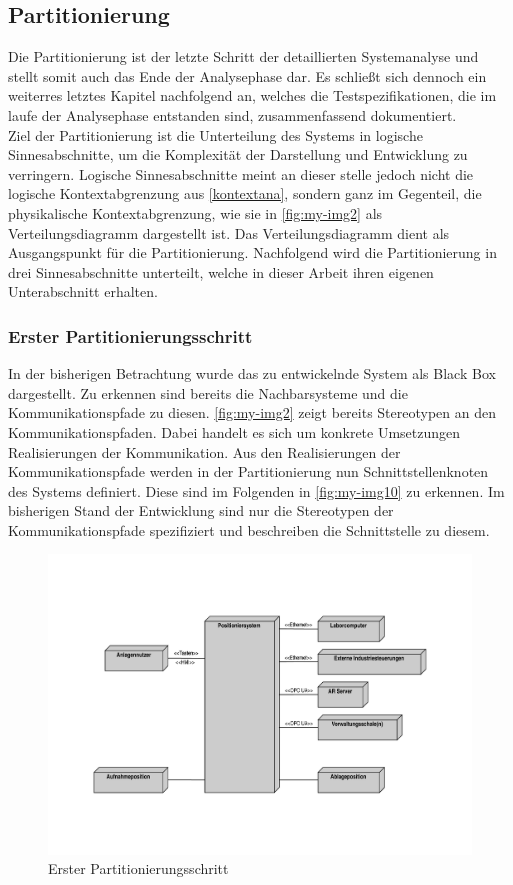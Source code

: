 \documentclass[../Bachelorarbeit.tex]{subfiles}
\begin{document}
\subsection{Partitionierung}
Die Partitionierung ist der letzte Schritt der detaillierten Systemanalyse und stellt somit auch das Ende der Analysephase dar. Es schließt sich dennoch ein weiterres letztes Kapitel nachfolgend an, welches die Testspezifikationen, die im laufe der Analysephase entstanden sind, zusammenfassend dokumentiert. \\
Ziel der Partitionierung ist die Unterteilung des Systems in logische Sinnesabschnitte, um die Komplexität der Darstellung und Entwicklung zu verringern. Logische Sinnesabschnitte meint an dieser stelle jedoch nicht die logische Kontextabgrenzung aus \autoref{kontextana}, sondern ganz im Gegenteil, die physikalische Kontextabgrenzung, wie sie in \autoref{fig:my-img2} als Verteilungsdiagramm dargestellt ist. Das Verteilungsdiagramm dient als Ausgangspunkt für die Partitionierung. Nachfolgend wird die Partitionierung in drei Sinnesabschnitte unterteilt, welche in dieser Arbeit ihren eigenen Unterabschnitt erhalten. \\ %

\subsubsection{Erster Partitionierungsschritt}
In der bisherigen Betrachtung wurde das zu entwickelnde System als Black Box dargestellt. Zu erkennen sind bereits die Nachbarsysteme und die Kommunikationspfade zu diesen. \autoref{fig:my-img2} zeigt bereits Stereotypen an den Kommunikationspfaden. Dabei handelt es sich um konkrete Umsetzungen \bzw Realisierungen der Kommunikation. Aus den Realisierungen der Kommunikationspfade werden in der Partitionierung nun Schnittstellenknoten des Systems definiert. Diese sind im Folgenden in \autoref{fig:my-img10} zu erkennen. Im bisherigen Stand der Entwicklung sind nur die Stereotypen der Kommunikationspfade spezifiziert und beschreiben die Schnittstelle zu diesem. 

\begin{figure}[H]
    \centering
    \includegraphics[width=\textwidth]{Images/phys_abgrenzung.pdf}
    \caption[Erster Partitionierungsschritt]{Erster Partitionierungsschritt}
    \label{fig:my-img10}
\end{figure}
\end{document}
